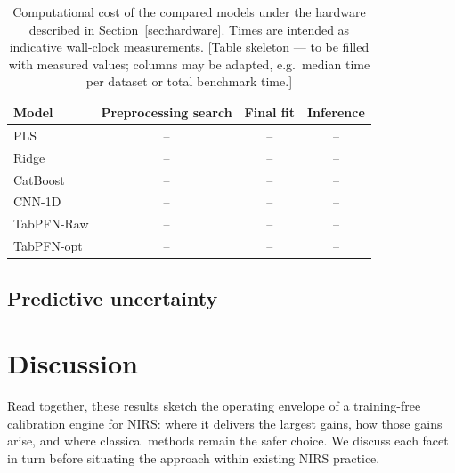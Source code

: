 \documentclass{article}
\begin{document}
\begin{table}[!htbp]
\centering
\caption{Computational cost of the compared models under the hardware described in Section~\ref{sec:hardware}. Times are intended as indicative wall-clock measurements. \textnormal{[Table skeleton --- to be filled with measured values; columns may be adapted, e.g.\ median time per dataset or total benchmark time.]}}
\label{tab:computational_cost}
\small
\begin{tabular}{lccc}
\toprule
Model & Preprocessing search & Final fit & Inference \\
\midrule
PLS         & -- & -- & -- \\
Ridge       & -- & -- & -- \\
CatBoost    & -- & -- & -- \\
CNN-1D      & -- & -- & -- \\
TabPFN-Raw  & -- & -- & -- \\
TabPFN-opt  & -- & -- & -- \\
\bottomrule
\end{tabular}
\end{table}


\subsection{Predictive uncertainty} \label{sec:uncertainty_results}





\section{Discussion} \label{sec:discussion}

Read together, these results sketch the operating envelope of a training-free calibration engine for NIRS: where it delivers the largest gains, how those gains arise, and where classical methods remain the safer choice. We discuss each facet in turn before situating the approach within existing NIRS practice.
\end{document}
